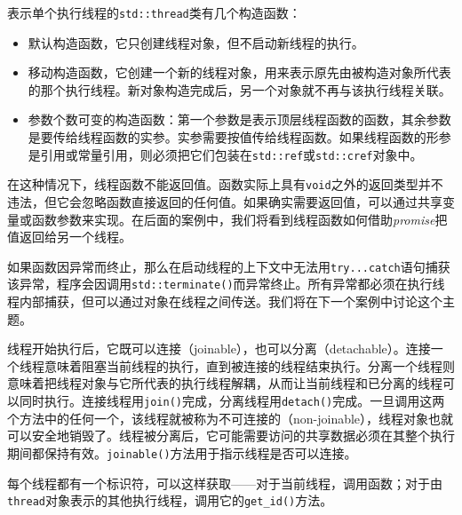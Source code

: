 表示单个执行线程的\texttt{std::\allowbreak{}thread}类有几个构造函数：



\begin{itemize}
\item 默认构造函数，它只创建线程对象，但不启动新线程的执行。



\item 移动构造函数，它创建一个新的线程对象，用来表示原先由被构造对象所代表的那个执行线程。新对象构造完成后，另一个对象就不再与该执行线程关联。



\item 参数个数可变的构造函数：第一个参数是表示顶层线程函数的函数，其余参数是要传给线程函数的实参。实参需要按值传给线程函数。如果线程函数的形参是引用或常量引用，则必须把它们包装在\texttt{std::\allowbreak{}ref}或\texttt{std::\allowbreak{}cref}对象中。


\end{itemize}



在这种情况下，线程函数不能返回值。函数实际上具有\texttt{void}之外的返回类型并不违法，但它会忽略函数直接返回的任何值。如果确实需要返回值，可以通过共享变量或函数参数来实现。在后面的案例中，我们将看到线程函数如何借助\textit{promise}把值返回给另一个线程。



如果函数因异常而终止，那么在启动线程的上下文中无法用\texttt{try...\allowbreak{}catch}语句捕获该异常，程序会因调用\texttt{std::\allowbreak{}terminate()}而异常终止。所有异常都必须在执行线程内部捕获，但可以通过对象在线程之间传送。我们将在下一个案例中讨论这个主题。



线程开始执行后，它既可以连接（joinable），也可以分离（detachable）。连接一个线程意味着阻塞当前线程的执行，直到被连接的线程结束执行。分离一个线程则意味着把线程对象与它所代表的执行线程解耦，从而让当前线程和已分离的线程可以同时执行。连接线程用\texttt{join()}完成，分离线程用\texttt{detach()}完成。一旦调用这两个方法中的任何一个，该线程就被称为不可连接的（non-joinable），线程对象也就可以安全地销毁了。线程被分离后，它可能需要访问的共享数据必须在其整个执行期间都保持有效。\texttt{joinable()}方法用于指示线程是否可以连接。



每个线程都有一个标识符，可以这样获取——对于当前线程，调用函数；对于由\texttt{thread}对象表示的其他执行线程，调用它的\texttt{get\_\allowbreak{}id()}方法。


